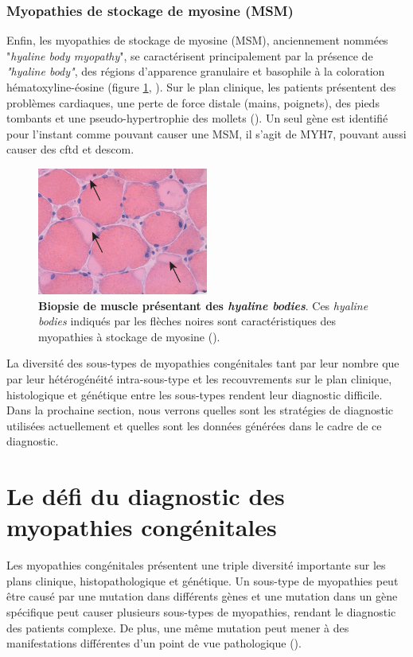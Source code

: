 \subsubsection{Myopathies de stockage de myosine (MSM)}
Enfin, les myopathies de stockage de myosine (MSM), anciennement nommées "\textit{hyaline body myopathy}", se caractérisent principalement par la présence de \textit{"hyaline body"}, des régions d'apparence granulaire et basophile à la coloration hématoxyline-éosine (figure \ref{fig:hyaline}, \cite{claeys_congenital_2020, victor_dubowitz_muscle_2020}). Sur le plan clinique, les patients présentent des problèmes cardiaques, une perte de force distale (mains, poignets), des pieds tombants et une pseudo-hypertrophie des mollets (\cite{cassandrini_congenital_2017}). Un seul gène est identifié pour l'instant comme pouvant causer une MSM, il s'agit de MYH7, pouvant aussi causer des \gls{cftd} et des\gls{com}.
\begin{figure}[!ht]
 \centering
 \includegraphics[width=0.5\textwidth]{figures/hyalin.jpg}
 \caption[Biopsie de muscle des \textit{hyaline bodies}]{\textbf{Biopsie de muscle présentant des \textit{hyaline bodies}}. Ces \textit{hyaline bodies} indiqués par les flèches noires sont caractéristiques des myopathies à stockage de myosine (\cite{victor_dubowitz_muscle_2020}).}
 \label{fig:hyaline}
\end{figure}

La diversité des sous-types de myopathies congénitales tant par leur nombre que par leur hétérogénéité intra-sous-type et les recouvrements sur le plan clinique, histologique et génétique entre les sous-types rendent leur diagnostic difficile. Dans la prochaine section, nous verrons quelles sont les stratégies de diagnostic utilisées actuellement et quelles sont les données générées dans le cadre de ce diagnostic.

\section{Le défi du diagnostic des myopathies congénitales}
Les myopathies congénitales présentent une triple diversité importante sur les plans clinique, histopathologique et génétique. Un sous-type de myopathies peut être causé par une mutation dans différents gènes et une mutation dans un gène spécifique peut causer plusieurs sous-types de myopathies, rendant le diagnostic des patients complexe. De plus, une même mutation peut mener à des manifestations différentes d'un point de vue pathologique (\cite{north_approach_2014}). 

